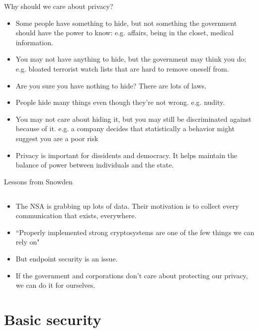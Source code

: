 \documentclass{beamer}
\begin{document}
\begin{frame}{Why should we care about privacy?}


\begin{itemize}
   \item<1>{Some people have something to hide, but not something the government should have the power to know: e.g. affairs, being in the closet, medical information.}
   \item<2>{You may not have anything to hide, but the government may think you do: e.g. bloated terrorist watch lists that are hard to remove oneself from.}
   \item<3>{Are you sure you have nothing to hide? There are lots of laws.}
   \item<4>{People hide many things even though they're not wrong. e.g. nudity.}
   \item<5>{You may not care about hiding it, but you may still be discriminated against because of it. e.g. a company decides that statistically a behavior might suggest you are a poor risk}
   \item<6>{Privacy is important for dissidents and democracy. It helps maintain the balance of power between individuals and the state.}
\end{itemize}

\end{frame}

\begin{frame}{Lessons from Snowden}
\subsection{}

\begin{itemize}
   \item{The NSA is grabbing up lots of data. Their motivation is to collect every communication that exists, everywhere. }
   \item{``Properly implemented strong cryptosystems are one of the few things we can rely on"}
   \item{But endpoint security is an issue.}
   \item{If the government and corporations don't care about protecting our privacy, we can do it for ourselves.}  
\end{itemize}
\end{frame}

\section{Basic security}
\end{document}
